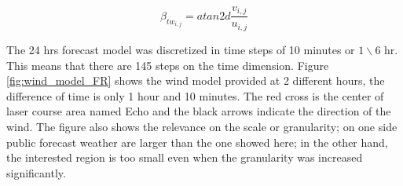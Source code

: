 \begin{equation}\label{eq:b_tw}
    \beta_{tw_{i,j}}= atan2d \frac {v_{i,j}}{u_{i,j}}
\end{equation}

The 24 hrs forecast model was discretized in time steps of 10 minutes or ${1} \backslash {6}$ hr. This means that there are 145 steps on the time dimension. Figure \ref{fig:wind_model_FR} shows the wind model provided at 2 different hours, the difference of time is only 1 hour and 10 minutes. The red cross is the center of laser course area named Echo and the black arrows indicate the direction of the wind. The figure also shows the relevance on the scale or granularity; on one side public forecast weather are larger than the one showed here; in the other hand, the interested region is too small even when the granularity was increased significantly. \par    

